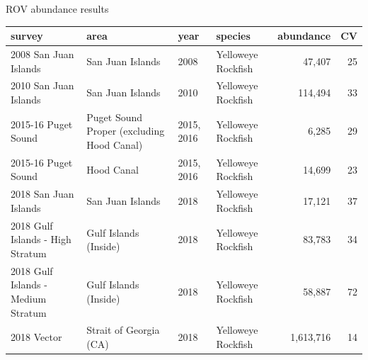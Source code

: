 \documentclass[
  ignorenonframetext,
]{beamer}
\begin{document}
\begin{frame}{ROV abundance results}
\protect\hypertarget{rov-abundance-results}{}
\begin{table}[H]
\centering\begingroup\fontsize{16}{18}\selectfont

\begin{tabular}{l|l|l|l|r|r}
\hline
survey & area & year & species & abundance & CV\\
\hline
2008 San Juan Islands & San Juan Islands & 2008 & Yelloweye Rockfish & 47,407 & 25\\
\hline
2010 San Juan Islands & San Juan Islands & 2010 & Yelloweye Rockfish & 114,494 & 33\\
\hline
2015-16 Puget Sound & Puget Sound Proper (excluding Hood Canal) & 2015, 2016 & Yelloweye Rockfish & 6,285 & 29\\
\hline
2015-16 Puget Sound & Hood Canal & 2015, 2016 & Yelloweye Rockfish & 14,699 & 23\\
\hline
2018 San Juan Islands & San Juan Islands & 2018 & Yelloweye Rockfish & 17,121 & 37\\
\hline
2018 Gulf Islands - High Stratum & Gulf Islands (Inside) & 2018 & Yelloweye Rockfish & 83,783 & 34\\
\hline
2018 Gulf Islands - Medium Stratum & Gulf Islands (Inside) & 2018 & Yelloweye Rockfish & 58,887 & 72\\
\hline
2018 Vector & Strait of Georgia (CA) & 2018 & Yelloweye Rockfish & 1,613,716 & 14\\
\hline
\end{tabular}
\endgroup{}
\end{table}
\end{frame}
\end{document}
